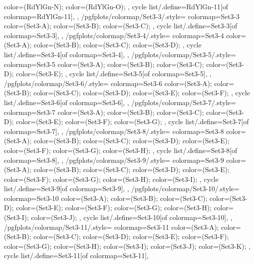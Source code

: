 {{{      color=(RdYlGn-N);
      color=(RdYlGn-O);
    },
    cycle list/.define={RdYlGn-11}{[of colormap=RdYlGn-11]},
  },
  /pgfplots/colormap/Set3-3/.style={
    colormap={Set3-3}{
      color=(Set3-A);
      color=(Set3-B);
      color=(Set3-C);
    },
    cycle list/.define={Set3-3}{[of colormap=Set3-3]},
  },
  /pgfplots/colormap/Set3-4/.style={
    colormap={Set3-4}{
      color=(Set3-A);
      color=(Set3-B);
      color=(Set3-C);
      color=(Set3-D);
    },
    cycle list/.define={Set3-4}{[of colormap=Set3-4]},
  },
  /pgfplots/colormap/Set3-5/.style={
    colormap={Set3-5}{
      color=(Set3-A);
      color=(Set3-B);
      color=(Set3-C);
      color=(Set3-D);
      color=(Set3-E);
    },
    cycle list/.define={Set3-5}{[of colormap=Set3-5]},
  },
  /pgfplots/colormap/Set3-6/.style={
    colormap={Set3-6}{
      color=(Set3-A);
      color=(Set3-B);
      color=(Set3-C);
      color=(Set3-D);
      color=(Set3-E);
      color=(Set3-F);
    },
    cycle list/.define={Set3-6}{[of colormap=Set3-6]},
  },
  /pgfplots/colormap/Set3-7/.style={
    colormap={Set3-7}{
      color=(Set3-A);
      color=(Set3-B);
      color=(Set3-C);
      color=(Set3-D);
      color=(Set3-E);
      color=(Set3-F);
      color=(Set3-G);
    },
    cycle list/.define={Set3-7}{[of colormap=Set3-7]},
  },
  /pgfplots/colormap/Set3-8/.style={
    colormap={Set3-8}{
      color=(Set3-A);
      color=(Set3-B);
      color=(Set3-C);
      color=(Set3-D);
      color=(Set3-E);
      color=(Set3-F);
      color=(Set3-G);
      color=(Set3-H);
    },
    cycle list/.define={Set3-8}{[of colormap=Set3-8]},
  },
  /pgfplots/colormap/Set3-9/.style={
    colormap={Set3-9}{
      color=(Set3-A);
      color=(Set3-B);
      color=(Set3-C);
      color=(Set3-D);
      color=(Set3-E);
      color=(Set3-F);
      color=(Set3-G);
      color=(Set3-H);
      color=(Set3-I);
    },
    cycle list/.define={Set3-9}{[of colormap=Set3-9]},
  },
  /pgfplots/colormap/Set3-10/.style={
    colormap={Set3-10}{
      color=(Set3-A);
      color=(Set3-B);
      color=(Set3-C);
      color=(Set3-D);
      color=(Set3-E);
      color=(Set3-F);
      color=(Set3-G);
      color=(Set3-H);
      color=(Set3-I);
      color=(Set3-J);
    },
    cycle list/.define={Set3-10}{[of colormap=Set3-10]},
  },
  /pgfplots/colormap/Set3-11/.style={
    colormap={Set3-11}{
      color=(Set3-A);
      color=(Set3-B);
      color=(Set3-C);
      color=(Set3-D);
      color=(Set3-E);
      color=(Set3-F);
      color=(Set3-G);
      color=(Set3-H);
      color=(Set3-I);
      color=(Set3-J);
      color=(Set3-K);
    },
    cycle list/.define={Set3-11}{[of colormap=Set3-11]},
}}
